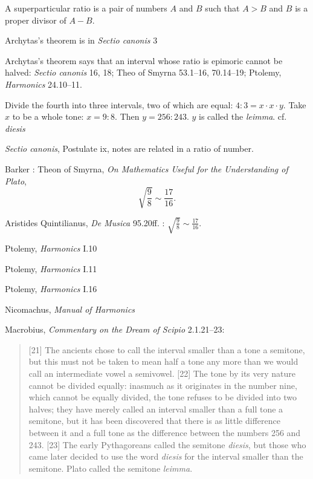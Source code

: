 \documentclass{amsart}
\theoremstyle{definition}
\begin{document}
A superparticular ratio is a pair of numbers $A$ and $B$ such that $A>B$ and
$B$ is a proper divisor of $A-B$.

Archytas's theorem is in {\em Sectio canonis} 3

Archytas's theorem says that an interval whose ratio is epimoric cannot be halved: {\em Sectio canonis} 16, 18; 
Theo of Smyrna 53.1--16, 70.14--19; 
Ptolemy, {\em Harmonics} 24.10--11.

Divide the fourth into three intervals, two of which are equal:
$4:3 = x \cdot x \cdot y$. Take $x$ to be a whole tone: $x=9:8$. Then $y=256:243$. 
$y$ is called the {\em leimma}. cf. {\em diesis}

{\em Sectio canonis}, Postulate ix, notes are related in a ratio of number.

Barker \cite[p.~223]{barker}: Theon of Smyrna, {\em On Mathematics Useful for the Understanding of Plato},
\[
\sqrt{\frac{9}{8}} \sim \frac{17}{16}.
\]

Aristides Quintilianus, {\em De Musica} 95.20ff. \cite[p.~496]{barker}: $\sqrt{\frac{9}{8}} \sim \frac{17}{16}$. 

Ptolemy, {\em Harmonics} I.10 \cite[pp.~297--298]{barker}

Ptolemy, {\em Harmonics} I.11 \cite[pp.~298--299]{barker}

Ptolemy, {\em Harmonics} I.16 \cite[pp.~312--313]{barker}

Nicomachus, {\em Manual of Harmonics}

Macrobius, {\em Commentary on the Dream of Scipio} \cite[pp.~188--189]{macrobius} 2.1.21--23:

\begin{quote}
[21] The ancients chose to call the interval smaller than a tone a semitone, but this must not be taken to mean half a tone
any more than we would call an intermediate vowel a semivowel. [22] The tone by its
very nature cannot be divided equally: inasmuch as it originates in the number nine, which cannot be equally divided,
the tone refuses to be divided into two halves; they have merely called an interval smaller than a full tone a semitone,
but it has been discovered that there is as little difference between it and a full tone as the difference
between the numbers 256 and 243. [23] The early Pythagoreans called the semitone {\em diesis}, but those who came later
decided to use the word {\em diesis} for the interval smaller than the semitone. Plato called the semitone
{\em leimma}.
\end{quote}
\end{document}
